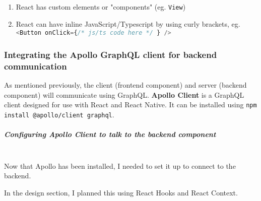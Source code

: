 \documentclass[../../main.tex]{subfiles}
\begin{document}
\begin{enumerate}
  \item React has custom elements or "components" (eg. \lstinline{View})
  \item React can have inline JavaScript/Typescript by using curly brackets, eg.\\
        \lstinline[language=typescript]|<Button onClick={/* js/ts code here */ } />|
\end{enumerate}

\subsubsection{Integrating the Apollo GraphQL client for backend communication}

As mentioned previously, the client (frontend component) and server (backend component)
will communicate using GraphQL. \textbf{Apollo Client} is a GraphQL client designed for use with
React and React Native. It can be installed using
\lstinline[language=bash]{npm install @apollo/client graphql}.

\subparagraph{Configuring Apollo Client to talk to the backend component\\}


\noindent \\ Now that Apollo has been installed, I needed to set it up to connect to the backend.

In the design section, I planned this using React Hooks and React Context.

\end{document}
